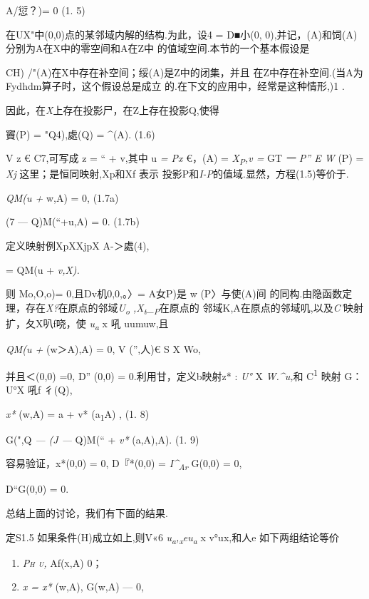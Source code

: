 \documentclass{article}
\begin{document}
A/愆？)= 0 (1. 5)

在UX"中(0,0)点的某邻域内解的结构.为此，设4 = D■小(0,
0),并记，(A)和饲(A)分别为A在X中的零空间和A在Z中
的值域空间.本节的一个基本假设是

CH) /"(A)在X中存在补空间；绥(A)是Z中的闭集，并且
在Z中存在补空间.(当A为Fydhdm算子时，这个假设总是成立
的.在下文的应用中，经常是这种情形,)1 .

因此，在\emph{X}上存在投影尸，在Z上存在投影Q,使得

竇(P) = "Q4),處(Q) = \^{}(A). (1.6)

V z € C7,可写成 z = `` + v,其中 u \emph{= Px} €，(A) =
\emph{X\textsubscript{P},v =} GT \emph{一 P'' E W} (P) = \emph{Xj}
这里；是恒同映射,Xp和Xf 表示
投影P和\emph{I-P}的值域.显然，方程(1.5)等价于.

\emph{QM(u +} w,A) = 0, (1.7a)

(7 --- Q)M(``+u,A) = 0. (1.7b)

定义映射例XpXXjpX A-＞處(4),

= QM(u + \emph{v,X).}

则 Mo,O,o)= 0,且Dv机0,0,。〉= A\textbar{}女P)是 w (P〉与使(A)间
的同构.由隐函数定理，存在\emph{X?}在原点的邻域\emph{U\textsubscript{o}
,X\textsubscript{t}\_\textsubscript{P}}在原点的
邻域K,A在原点的邻域叽,以及\emph{C'}映射扩，夂X叭f哓，使
\emph{u\textsubscript{a}} x 吼 uumuw,且

\emph{QM(u +} (w＞A),A) = 0, V ('',人)€ S X Wo,

并且＜(0,0) =0, D'' (0,0) = 0.利用甘，定义b映射z* : \emph{U°} X
\emph{W.\^{}u,}和 C\textsuperscript{1} 映射 G：U°X 吼f 彳(Q),

\emph{x*} (w,A) = a + v* (a\textsubscript{1}A) , (1. 8)

G(",Q \emph{--- (J ---} Q)M(`` + \emph{v*} (a,A),A). (1. 9)

容易验证，x*(0,0) = 0, D『*(0,0) = \emph{I\^{}\textsubscript{Ar}} G(0,0)
= 0,

D``G(0,0) = 0.

总结上面的讨论，我们有下面的结果.

定S1.5 如果条件(H)成立如上,则V«6
\emph{u\textsubscript{a},\textsubscript{x}eu\textsubscript{a}} x
v°ux,和人e 如下两组结论等价

\begin{enumerate}
\def\labelenumi{(\arabic{enumi})}
\item
  \emph{\textsc{Ph u,}} Af\textsc{(x,A)} 0；
\item
  \emph{x = x*} (w,A), G(w,A) --- 0,
\end{enumerate}
\end{document}
